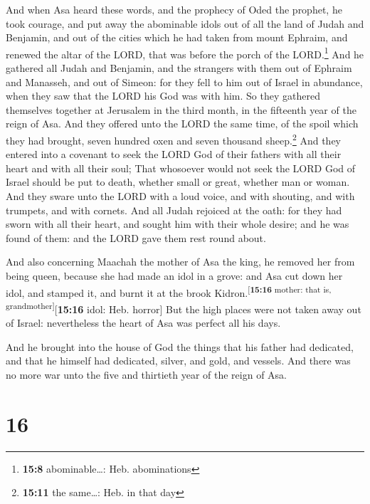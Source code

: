  And when Asa heard these words, and the prophecy of Oded
the prophet, he took courage, and put away the abominable idols out of
all the land of Judah and Benjamin, and out of the cities which he had
taken from mount Ephraim, and renewed the altar of the LORD, that was
before the porch of the LORD.\footnote{\textbf{15:8} abominable\ldots:
  Heb. abominations}  And he gathered all Judah and
Benjamin, and the strangers with them out of Ephraim and Manasseh, and
out of Simeon: for they fell to him out of Israel in abundance, when
they saw that the LORD his God was with him.  So they
gathered themselves together at Jerusalem in the third month, in the
fifteenth year of the reign of Asa.  And they offered
unto the LORD the same time, of the spoil which they had brought, seven
hundred oxen and seven thousand sheep.\footnote{\textbf{15:11} the
  same\ldots: Heb. in that day}  And they entered into a
covenant to seek the LORD God of their fathers with all their heart and
with all their soul;  That whosoever would not seek the
LORD God of Israel should be put to death, whether small or great,
whether man or woman.  And they sware unto the LORD with
a loud voice, and with shouting, and with trumpets, and with cornets.
 And all Judah rejoiced at the oath: for they had sworn
with all their heart, and sought him with their whole desire; and he was
found of them: and the LORD gave them rest round about.

 And also concerning Maachah the mother of Asa the king,
he removed her from being queen, because she had made an idol in a
grove: and Asa cut down her idol, and stamped it, and burnt it at the
brook Kidron.\textsuperscript{{[}\textbf{15:16} mother: that is,
grandmother{]}}{[}\textbf{15:16} idol: Heb. horror{]} 
But the high places were not taken away out of Israel: nevertheless the
heart of Asa was perfect all his days.

 And he brought into the house of God the things that his
father had dedicated, and that he himself had dedicated, silver, and
gold, and vessels.  And there was no more war unto the
five and thirtieth year of the reign of Asa.

\hypertarget{section-15}{%
\section{16}\label{section-15}}

